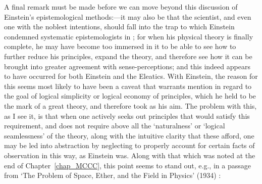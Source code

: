 A final remark must be made before we can move beyond this discussion of Einstein's epistemological methods:---it may also be that the scientist, and even one with the noblest intentions, should fall into the trap to which Einstein condemned systematic epistemologists in \cite{Einstein1951}; for when his physical theory is finally complete, he may have become too immersed in it to be able to see how to further reduce his principles, expand the theory, and therefore see how it can be brought into greater agreement with sense-perceptions; and this indeed appears to have occurred for both Einstein and the Eleatics. With Einstein, the reason for this seems most likely to have been a caveat that warrants mention in regard to the goal of logical simplicity or logical economy of principles, which he held to be the mark of a great theory, and therefore took as his aim. The problem with this, as I see it, is that when one actively seeks out principles that would satisfy this requirement, and does not require above all the `naturalness' or `logical seamlessness' of the theory, along with the intuitive clarity that these afford, one may be led into abstraction by neglecting to properly account for certain facts of observation in this way, as Einstein was. Along with that which was noted at the end of Chapter~\ref{chap_MCCC}, this point seems to stand out, e.g., in a passage from `The Problem of Space, Ether, and the Field in Physics' (1934) \cite{Einstein1954}:
